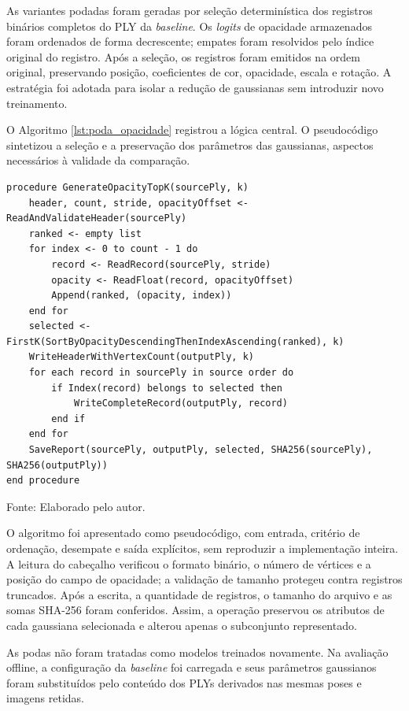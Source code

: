 As variantes podadas foram geradas por seleção determinística dos registros binários completos do PLY da \textit{baseline}. Os \textit{logits} de opacidade armazenados foram ordenados de forma decrescente; empates foram resolvidos pelo índice original do registro. Após a seleção, os registros foram emitidos na ordem original, preservando posição, coeficientes de cor, opacidade, escala e rotação. A estratégia foi adotada para isolar a redução de gaussianas sem introduzir novo treinamento.

O Algoritmo \ref{lst:poda_opacidade} registrou a lógica central. O pseudocódigo sintetizou a seleção e a preservação dos parâmetros das gaussianas, aspectos necessários à validade da comparação.

\begin{lstlisting}[caption={Poda determinística por opacidade.},label={lst:poda_opacidade},captionpos=t]
procedure GenerateOpacityTopK(sourcePly, k)
    header, count, stride, opacityOffset <- ReadAndValidateHeader(sourcePly)
    ranked <- empty list
    for index <- 0 to count - 1 do
        record <- ReadRecord(sourcePly, stride)
        opacity <- ReadFloat(record, opacityOffset)
        Append(ranked, (opacity, index))
    end for
    selected <- FirstK(SortByOpacityDescendingThenIndexAscending(ranked), k)
    WriteHeaderWithVertexCount(outputPly, k)
    for each record in sourcePly in source order do
        if Index(record) belongs to selected then
            WriteCompleteRecord(outputPly, record)
        end if
    end for
    SaveReport(sourcePly, outputPly, selected, SHA256(sourcePly), SHA256(outputPly))
end procedure
\end{lstlisting}
\noindent\footnotesize Fonte: Elaborado pelo autor.\normalsize

O algoritmo foi apresentado como pseudocódigo, com entrada, critério de ordenação, desempate e saída explícitos, sem reproduzir a implementação inteira. A leitura do cabeçalho verificou o formato binário, o número de vértices e a posição do campo de opacidade; a validação de tamanho protegeu contra registros truncados. Após a escrita, a quantidade de registros, o tamanho do arquivo e as somas SHA-256 foram conferidos. Assim, a operação preservou os atributos de cada gaussiana selecionada e alterou apenas o subconjunto representado.

As podas não foram tratadas como modelos treinados novamente. Na avaliação offline, a configuração da \textit{baseline} foi carregada e seus parâmetros gaussianos foram substituídos pelo conteúdo dos PLYs derivados nas mesmas poses e imagens retidas.

